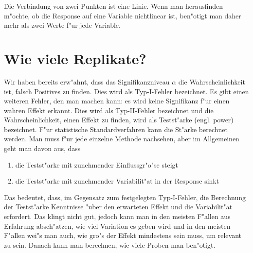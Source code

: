 \documentclass[a4paper,twoside]{tufte-book}\usepackage[]{graphicx}\usepackage[]{color}
\begin{document}
Die Verbindung von zwei Punkten ist eine Linie. Wenn man herausfinden m"ochte, ob die Response auf eine Variable nichtlinear ist, ben"otigt man daher mehr als zwei Werte f"ur jede Variable. 


\section{Wie viele Replikate?}

Wir haben bereits erw"ahnt, dass das Signifikanzniveau $\alpha$ die Wahrscheinlichkeit ist, falsch Positives zu finden. Dies wird als Typ-I-Fehler bezeichnet. Es gibt einen weiteren Fehler, den man machen kann: es wird keine Signifikanz f"ur einen wahren Effekt erkannt. Dies wird als Typ-II-Fehler bezeichnet und die Wahrscheinlichkeit, einen Effekt zu finden, wird als Testst"arke (engl. power) bezeichnet. F"ur statistische Standardverfahren kann die St"arke berechnet werden. Man muss f"ur jede einzelne Methode nachsehen, aber im Allgemeinen geht man davon aus, dass 

\begin{enumerate}
\item die Testst"arke mit zunehmender Einflussgr"o"se steigt 
\item die Testst"arke mit zunehmender Variabilit"at in der Response sinkt
\end{enumerate}

Das bedeutet, dass, im Gegensatz zum festgelegten Typ-I-Fehler, die Berechnung der Testst"arke Kenntnisse "uber den erwarteten Effekt und die Variabilit"at erfordert. Das klingt nicht gut, jedoch kann man in den meisten F"allen aus Erfahrung absch"atzen, wie viel Variation es geben wird und in den meisten F"allen wei"s man auch, wie gro"s der Effekt mindestens sein muss, um relevant zu sein. Danach kann man berechnen, wie viele Proben man ben"otigt.
\end{document}
